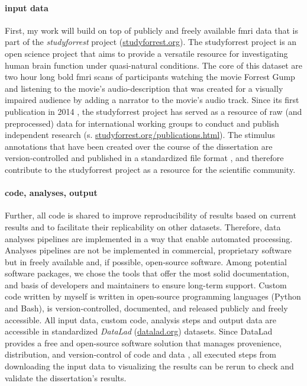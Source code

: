 \paragraph{input data}

First, my work will build on top of publicly and freely available \ac{fmri} data
that is part of the \textit{studyforrest} project
(\href{www.studyforrest.org}{studyforrest.org}).
%
The studyforrest project is an open science project that aims to provide a
versatile resource for investigating human brain function under quasi-natural
conditions.
%
The core of this dataset are two hour long \ac{bold} \ac{fmri} scans of
participants watching the movie Forrest Gump and listening to the movie's
audio-description that was created for a visually impaired audience by adding a
narrator to the movie's audio track.
%
Since its first publication in 2014 \citep{hanke2014audiomovie}, the
studyforrest project has served as a resource of raw (and preprocessed) data for
international working groups to conduct and publish independent research (s.
\href{www.studyforrest.org/publications.html}{studyforrest.org/publications.html}).
%
The stimulus annotations that have been created over the course of the
dissertation are version-controlled and published in a standardized file format
\citep{haeusler2021speechanno}, and therefore contribute to the studyforrest
project as a resource for the scientific community.


\paragraph{code, analyses, output}

Further, all code is shared to improve reproducibility of results based on
current results and to facilitate their replicability on other datasets.
Therefore, data analyses pipelines are implemented in a way that enable
automated processing.
%
Analyses pipelines are not be implemented in commercial, proprietary software
but in freely available and, if possible, open-source software.
Among potential software packages, we chose the tools that offer the most solid
documentation, and basis of developers and maintainers to ensure long-term
support.
Custom code written by myself is written in open-source programming languages
(Python and Bash), is version-controlled, documented, and released publicly and
freely accessible.
%
All input data, custom code, analysis steps and output data are accessible in
standardized \textit{DataLad} (\href{www.datalad.org}{datalad.org}) datasets.
Since DataLad provides a free and open-source software solution that manages
provenience, distribution, and version-control of code and data
\citep{halchenko2021datalad}, all executed steps from downloading the input data
to visualizing the results can be rerun to check and validate the dissertation's
results.


